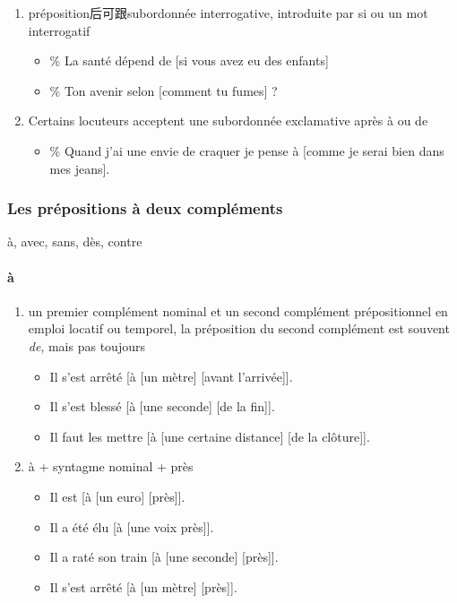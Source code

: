 \documentclass[UTF8]{report}
\begin{document}
\begin{enumerate}
    \item préposition后可跟subordonnée interrogative, introduite par si ou un mot interrogatif
    \begin{itemize}
        \item \% La santé dépend de [si vous avez eu des enfants]
        \item \% Ton avenir selon [comment tu fumes] ?
    \end{itemize}
    \item  Certains locuteurs acceptent une subordonnée exclamative après à ou de
    \begin{itemize}
        \item \% Quand j’ai une envie de craquer je pense à [comme je serai bien dans mes jeans].
    \end{itemize}
\end{enumerate}

\subsubsection{Les prépositions à deux compléments}
à, avec, sans, dès, contre


\paragraph{à}
\begin{enumerate}
    \item un premier complément nominal et un second complément prépositionnel en emploi locatif ou temporel, la préposition du second complément est souvent \textit{de}, mais pas toujours
    
    \begin{itemize}
        \item Il s’est arrêté [à [un mètre] [avant l’arrivée]].
        \item Il s’est blessé [à [une seconde] [de la fin]].
        \item Il faut les mettre [à [une certaine distance] [de la clôture]].
    \end{itemize}
    \item à + syntagme nominal + près
    \begin{itemize}
        \item Il est [à [un euro] [près]].
        \item Il a été élu [à [une voix près]].
        \item Il a raté son train [à [une seconde] [près]].
        \item Il s’est arrêté [à [un mètre] [près]].
    \end{itemize}
\end{enumerate}
\end{document}
